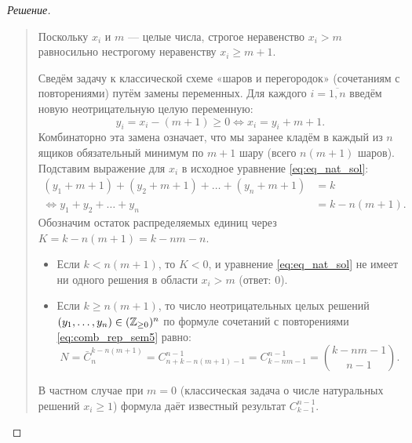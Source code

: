 \begin{proof}[Решение]~\\
    \begin{quote}
        Поскольку $x_i$ и $m$ --- целые числа, строгое неравенство 
        $x_i > m$ равносильно нестрогому неравенству $x_i \ge m + 1$.

        Сведём задачу к классической схеме «шаров и перегородок» (сочетаниям 
        с повторениями) путём замены переменных. Для каждого 
        $i = \overline{1, n}$ введём новую неотрицательную целую переменную:
        \[
            y_i = x_i - (m + 1) \ge 0 \iff x_i = y_i + m + 1.
        \]
        Комбинаторно эта замена означает, что мы заранее кладём в каждый из 
        $n$ ящиков обязательный минимум по $m + 1$ шару (всего 
        $n(m + 1)$ шаров). Подставим выражение для $x_i$ в исходное 
        уравнение \eqref{eq:eq_nat_sol}:
        \begin{align*}
            (y_1 + m + 1) + (y_2 + m + 1) + \dots + (y_n + m + 1) &= k \\
            \iff y_1 + y_2 + \dots + y_n &= k - n(m + 1).
        \end{align*}
        Обозначим остаток распределяемых единиц через 
        $K = k - n(m + 1) = k - n m - n$.
        \begin{itemize}
            \item Если $k < n(m + 1)$, то $K < 0$, и уравнение 
            \eqref{eq:eq_nat_sol} не имеет ни одного решения в области 
            $x_i > m$ (ответ: $0$).
            \item Если $k \ge n(m + 1)$, то число неотрицательных целых 
            решений $(y_1, \dots, y_n) \in (\mathbb{Z}_{\ge 0})^n$ по формуле 
            сочетаний с повторениями \eqref{eq:comb_rep_sem5} равно:
            \[
                N = \bar{C}_n^{k - n(m + 1)} = 
                C_{n + k - n(m + 1) - 1}^{n - 1} = 
                C_{k - n m - 1}^{n - 1} = 
                \binom{k - n m - 1}{n - 1}.
            \]
        \end{itemize}
        В частном случае при $m = 0$ (классическая задача о числе 
        натуральных решений $x_i \ge 1$) формула даёт известный результат 
        $C_{k-1}^{n-1}$.
    \end{quote}
\end{proof}